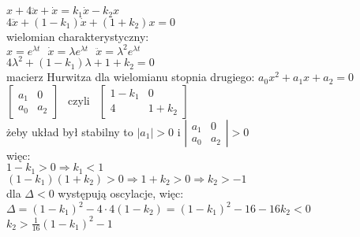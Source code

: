 \documentclass[a4paper,11pt]{article}
\begin{document}
$x+4\ddot{x}+\dot{x}=k_1\dot{x}-k_2x$\\
$4\ddot{x}+(1-k_1)\dot{x}+(1+k_2)x=0$\\
wielomian charakterystyczny:\\
$x=e^{\lambda t} \ \ \ \dot{x}=\lambda e^{\lambda t} \ \ \ \ddot{x}=\lambda^2 e^{\lambda t}$\\
$4\lambda^2+(1-k_1)\lambda+1+k_2=0$\\
macierz Hurwitza dla wielomianu stopnia drugiego:
$a_0x^2+a_1x+a_2=0$\\
$\left[\begin{array}{cc}a_1&0\\a_0&a_2\end{array}\right] \ \ $ czyli $\ \ 
\left[\begin{array}{cc}1-k_1&0\\4&1+k_2\end{array}\right]$\\
żeby układ był stabilny to $|a_1|>0$ i $\left|\begin{array}{cc}a_1&0\\a_0&a_2\end{array}\right|>0$\\
więc:\\
$1-k_1>0 \Rightarrow\boxed{ k_1<1}$\\
$(1-k_1)(1+k_2)>0 \Rightarrow 1+k_2>0 \Rightarrow \boxed{k_2>-1}$\\
dla $\Delta<0$ występują oscylacje, więc:\\
$\Delta=(1-k_1)^2-4\cdot4(1-k_2)=(1-k_1)^2-16-16k_2<0$\\
$k_2>\frac{1}{16}(1-k_1)^2-1$\\
\end{document}
